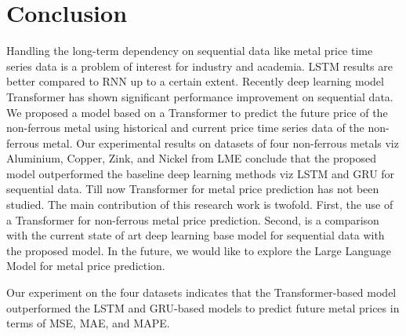 \documentclass[preprint,12pt]{elsarticle}
\begin{document}
\section{Conclusion}
Handling the long-term dependency on sequential data like metal price time series data is a problem of interest for industry and academia. LSTM results are better compared to RNN up to a certain extent. Recently deep learning model Transformer has shown significant performance improvement on sequential data. We proposed a model based on a Transformer to predict the future price of the non-ferrous metal using historical and current price time series data of the non-ferrous metal. Our experimental results on datasets of four non-ferrous metals viz Aluminium, Copper, Zink, and Nickel from LME conclude that the proposed model outperformed the baseline deep learning methods viz LSTM and GRU for sequential data. Till now Transformer for metal price prediction has not been studied. The main contribution of this research work is twofold. First, the use of a Transformer for non-ferrous metal price prediction. Second, is a comparison with the current state of art deep learning base model for sequential data with the proposed model. In the future, we would like to explore the Large Language Model for metal price prediction.  
\par Our experiment on the four datasets indicates that the Transformer-based model outperformed the LSTM and GRU-based models to predict future metal prices in terms of MSE, MAE, and MAPE.



\end{document}
